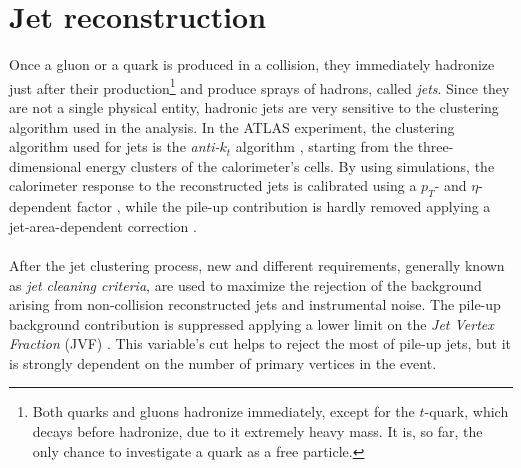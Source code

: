 \section{Jet reconstruction}
Once a gluon or a quark is produced in a collision, they immediately hadronize just after their production\footnote{Both quarks and gluons hadronize immediately, except for the $t$-quark, which decays before hadronize, due to it extremely heavy mass. It is, so far, the only chance to investigate a quark as a free particle.}
and produce sprays of hadrons, called \emph{jets}. Since they are not a single physical entity, hadronic jets are very sensitive to the clustering algorithm used in the analysis. In the ATLAS experiment, the clustering algorithm used for jets is the \emph{anti-}$k_t$ algorithm \cite{Cacciari_2008}, starting from the three-dimensional energy clusters of the calorimeter's cells. By using simulations, the calorimeter response to the reconstructed jets is calibrated using a $p_T$- and $\eta$-dependent factor \cite{Collaboration2017JetES}, while the pile-up contribution is hardly removed applying a jet-area-dependent correction \cite{2013PileupSA}.
\\\\
After the jet clustering process, new and different requirements, generally known as \emph{jet cleaning criteria}, are used to maximize the rejection of the background arising from non-collision reconstructed jets and instrumental noise. The pile-up background contribution is suppressed applying a lower limit on the \emph{Jet Vertex Fraction} (JVF) \cite{ATLAS-CONF-2014-018}. This variable's cut helps to reject the most of pile-up jets, but it is strongly dependent on the number of primary vertices in the event. 
